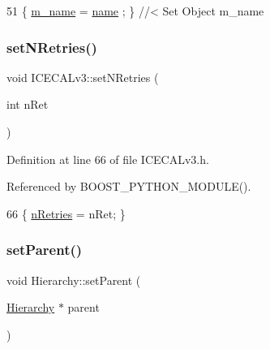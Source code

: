 \begin{DoxyCode}
51 \{ \hyperlink{classObject_a8b83c95c705d2c3ba0d081fe1710f48d}{m\_name}  = \hyperlink{classObject_a300f4c05dd468c7bb8b3c968868443c1}{name}  ; \} \textcolor{comment}{//< Set Object m\_name}
\end{DoxyCode}
\mbox{\label{classICECALv3_aae0b7539c0bba5311aab99e000d1be6d}} 
\subsubsection{\texorpdfstring{set\+N\+Retries()}{setNRetries()}}
{\footnotesize\ttfamily void I\+C\+E\+C\+A\+Lv3\+::set\+N\+Retries (\begin{DoxyParamCaption}\item[{int}]{n\+Ret }\end{DoxyParamCaption})\hspace{0.3cm}{\ttfamily [inline]}}



Definition at line 66 of file I\+C\+E\+C\+A\+Lv3.\+h.



Referenced by B\+O\+O\+S\+T\+\_\+\+P\+Y\+T\+H\+O\+N\+\_\+\+M\+O\+D\+U\+L\+E().


\begin{DoxyCode}
66 \{   \hyperlink{classICECALv3_ae877ce34b3a4d6c368cc6409ac9614fa}{nRetries} = nRet;                                \}
\end{DoxyCode}
\mbox{\label{classHierarchy_a585ad1aeec16077a0e532ab8b4fc557b}} 
\subsubsection{\texorpdfstring{set\+Parent()}{setParent()}}
{\footnotesize\ttfamily void Hierarchy\+::set\+Parent (\begin{DoxyParamCaption}\item[{\hyperlink{classHierarchy}{Hierarchy} $\ast$}]{parent }\end{DoxyParamCaption})\hspace{0.3cm}{\ttfamily [inherited]}}



